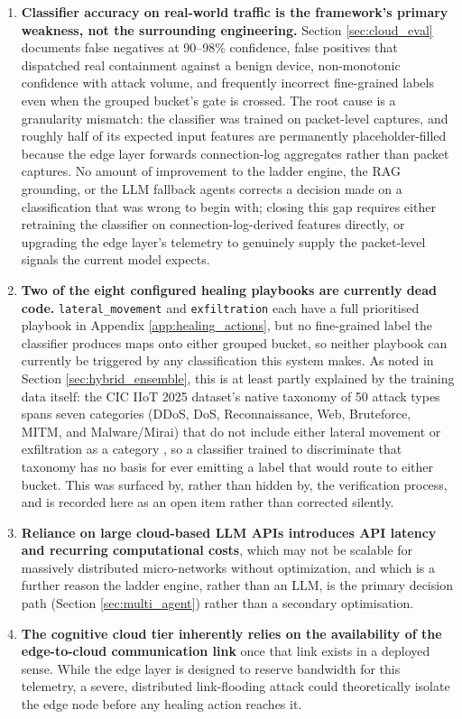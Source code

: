 \begin{enumerate}
	\item \textbf{Classifier accuracy on real-world traffic is the framework's primary weakness, not the surrounding engineering.} Section \ref{sec:cloud_eval} documents false negatives at 90--98\% confidence, false positives that dispatched real containment against a benign device, non-monotonic confidence with attack volume, and frequently incorrect fine-grained labels even when the grouped bucket's gate is crossed. The root cause is a granularity mismatch: the classifier was trained on packet-level captures, and roughly half of its expected input features are permanently placeholder-filled because the edge layer forwards connection-log aggregates rather than packet captures. No amount of improvement to the ladder engine, the RAG grounding, or the LLM fallback agents corrects a decision made on a classification that was wrong to begin with; closing this gap requires either retraining the classifier on connection-log-derived features directly, or upgrading the edge layer's telemetry to genuinely supply the packet-level signals the current model expects.
	\item \textbf{Two of the eight configured healing playbooks are currently dead code.} \texttt{lateral\_movement} and \texttt{exfiltration} each have a full prioritised playbook in Appendix \ref{app:healing_actions}, but no fine-grained label the classifier produces maps onto either grouped bucket, so neither playbook can currently be triggered by any classification this system makes. As noted in Section \ref{sec:hybrid_ensemble}, this is at least partly explained by the training data itself: the CIC IIoT 2025 dataset's native taxonomy of 50 attack types spans seven categories (DDoS, DoS, Reconnaissance, Web, Bruteforce, MITM, and Malware/Mirai) that do not include either lateral movement or exfiltration as a category \cite{Firouzi2025}, so a classifier trained to discriminate that taxonomy has no basis for ever emitting a label that would route to either bucket. This was surfaced by, rather than hidden by, the verification process, and is recorded here as an open item rather than corrected silently.
	\item \textbf{Reliance on large cloud-based LLM APIs introduces API latency and recurring computational costs}, which may not be scalable for massively distributed micro-networks without optimization, and which is a further reason the ladder engine, rather than an LLM, is the primary decision path (Section \ref{sec:multi_agent}) rather than a secondary optimisation.
	\item \textbf{The cognitive cloud tier inherently relies on the availability of the edge-to-cloud communication link} once that link exists in a deployed sense. While the edge layer is designed to reserve bandwidth for this telemetry, a severe, distributed link-flooding attack could theoretically isolate the edge node before any healing action reaches it.
\end{enumerate}


